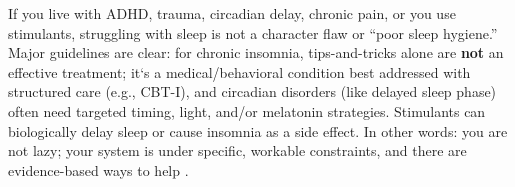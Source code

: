 If you live with ADHD, trauma, circadian delay, chronic pain, or you use stimulants, struggling with sleep is not a character flaw or “poor sleep hygiene.” Major guidelines are clear: for chronic insomnia, tips-and-tricks alone are \textbf{not} an effective treatment; it`s a medical/behavioral condition best addressed with structured care (e.g., CBT-I), and circadian disorders (like delayed sleep phase) often need targeted timing, light, and/or melatonin strategies. Stimulants can biologically delay sleep or cause insomnia as a side effect. In other words: you are not lazy; your system is under specific, workable constraints, and there are evidence-based ways to help \citep{qaseem2016acp_insomnia,schutte2008aasm_insomnia,auger2015aasm_circadian,snitselaar2013adhd_circadian,fda2023vyvanse_label}.

